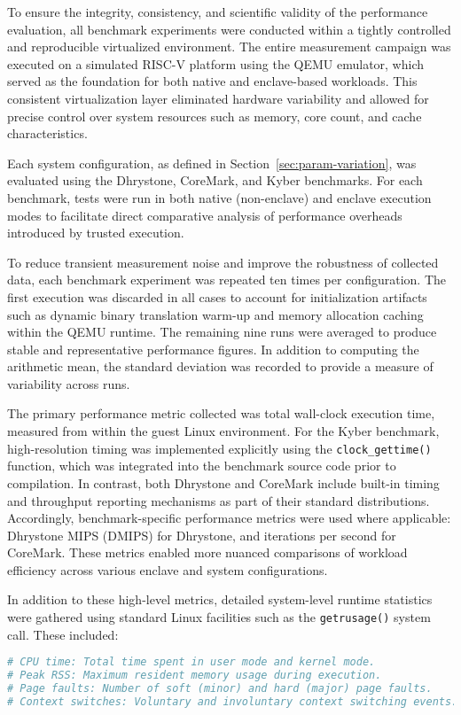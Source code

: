 To ensure the integrity, consistency, and scientific validity of the performance evaluation, all benchmark experiments were conducted within a tightly controlled and reproducible virtualized environment. The entire measurement campaign was executed on a simulated RISC-V platform using the QEMU emulator, which served as the foundation for both native and enclave-based workloads. This consistent virtualization layer eliminated hardware variability and allowed for precise control over system resources such as memory, core count, and cache characteristics.

Each system configuration, as defined in Section~\ref{sec:param-variation}, was evaluated using the Dhrystone, CoreMark, and Kyber benchmarks. For each benchmark, tests were run in both native (non-enclave) and enclave execution modes to facilitate direct comparative analysis of performance overheads introduced by trusted execution.

To reduce transient measurement noise and improve the robustness of collected data, each benchmark experiment was repeated ten times per configuration. The first execution was discarded in all cases to account for initialization artifacts such as dynamic binary translation warm-up and memory allocation caching within the QEMU runtime. The remaining nine runs were averaged to produce stable and representative performance figures. In addition to computing the arithmetic mean, the standard deviation was recorded to provide a measure of variability across runs.

The primary performance metric collected was total wall-clock execution time, measured from within the guest Linux environment. For the Kyber benchmark, high-resolution timing was implemented explicitly using the \texttt{clock\_gettime()} function, which was integrated into the benchmark source code prior to compilation. In contrast, both Dhrystone and CoreMark include built-in timing and throughput reporting mechanisms as part of their standard distributions. Accordingly, benchmark-specific performance metrics were used where applicable: Dhrystone MIPS (DMIPS) for Dhrystone, and iterations per second for CoreMark. These metrics enabled more nuanced comparisons of workload efficiency across various enclave and system configurations.

In addition to these high-level metrics, detailed system-level runtime statistics were gathered using standard Linux facilities such as the \texttt{getrusage()} system call. These included:

\begin{lstlisting}[language=bash]
# CPU time: Total time spent in user mode and kernel mode.
# Peak RSS: Maximum resident memory usage during execution.
# Page faults: Number of soft (minor) and hard (major) page faults.
# Context switches: Voluntary and involuntary context switching events.
\end{lstlisting}



